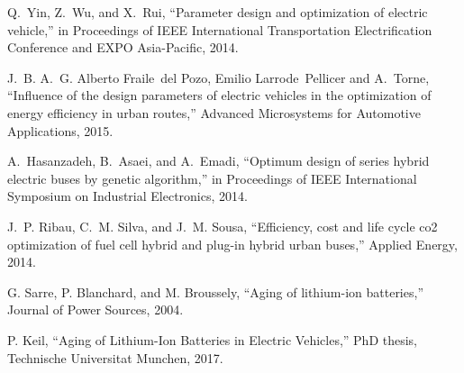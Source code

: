 Q.~Yin, Z.~Wu, and X.~Rui, ``Parameter design and optimization of electric
  vehicle,'' in Proceedings of IEEE International Transportation
  Electrification Conference and EXPO Asia-Pacific, 2014.

J.~B. A.~G. Alberto Fraile~del Pozo, Emilio Larrode~Pellicer and A.~Torne,
  ``Influence of the design parameters of electric vehicles in the optimization
  of energy efficiency in urban routes,'' Advanced Microsystems for
  Automotive Applications, 2015.

A.~Hasanzadeh, B.~Asaei, and A.~Emadi, ``Optimum design of series hybrid
  electric buses by genetic algorithm,'' in Proceedings of IEEE
  International Symposium on Industrial Electronics, 2014.

J.~P. Ribau, C.~M. Silva, and J.~M. Sousa, ``Efficiency, cost and life cycle
  co2 optimization of fuel cell hybrid and plug-in hybrid urban buses,''
  Applied Energy, 2014.
  
G. Sarre, P. Blanchard, and M. Broussely, ``Aging of lithium-ion batteries,''
  Journal of Power Sources, 2004.
  
P. Keil, ``Aging of Lithium-Ion Batteries in Electric Vehicles,'' PhD thesis, Technische Universitat Munchen, 2017.  

